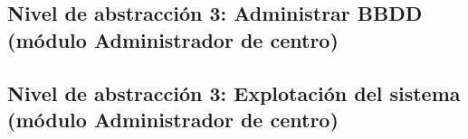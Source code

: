 \subsection{Nivel de abstracción 3: Administrar BBDD (módulo Administrador de centro)}



\subsection{Nivel de abstracción 3: Explotación del sistema (\-mó\-dulo Administrador de centro)}

